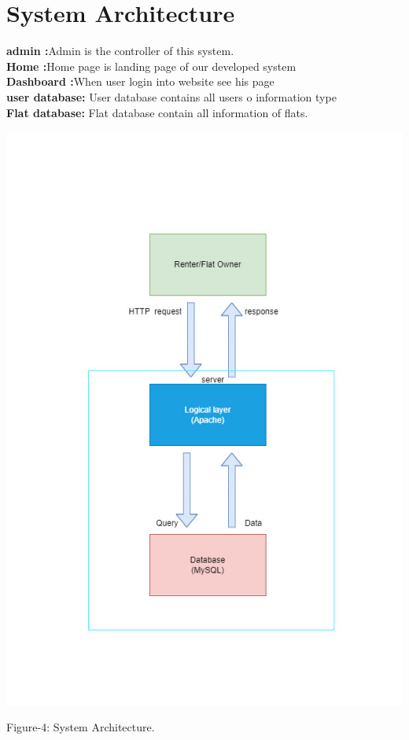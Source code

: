\section{System Architecture}\label{sec:sa}
\textbf{admin :}Admin is the controller of this system.\\
\textbf{Home :}Home page is landing page of our developed system\\
\textbf{Dashboard :}When user login into website see his page \\
\textbf{user database:} User database contains all users o information  type\\
\textbf{Flat database:} Flat database contain all information of flats.\\

\begin{center}
    
 
 
\includegraphics[width=1\textwidth,inner]{images/system.jpg}\\
\begin{center}
    Figure-4: System Architecture.
\end{center}
\end{center}
\clearpage
